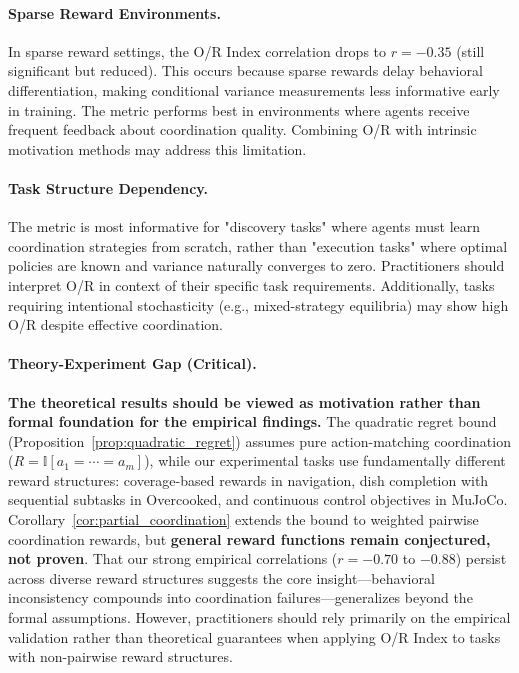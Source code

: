 \documentclass[twoside]{article}
\theoremstyle{remark}
\begin{document}
\paragraph{Sparse Reward Environments.}
In sparse reward settings, the O/R Index correlation drops to $r=-0.35$ (still significant but reduced). This occurs because sparse rewards delay behavioral differentiation, making conditional variance measurements less informative early in training. The metric performs best in environments where agents receive frequent feedback about coordination quality. Combining O/R with intrinsic motivation methods may address this limitation.

\paragraph{Task Structure Dependency.}
The metric is most informative for "discovery tasks" where agents must learn coordination strategies from scratch, rather than "execution tasks" where optimal policies are known and variance naturally converges to zero. Practitioners should interpret O/R in context of their specific task requirements. Additionally, tasks requiring intentional stochasticity (e.g., mixed-strategy equilibria) may show high O/R despite effective coordination.

\paragraph{Theory-Experiment Gap (Critical).}
\textbf{The theoretical results should be viewed as motivation rather than formal foundation for the empirical findings.} The quadratic regret bound (Proposition~\ref{prop:quadratic_regret}) assumes pure action-matching coordination ($R = \mathbb{I}[a_1 = \cdots = a_m]$), while our experimental tasks use fundamentally different reward structures: coverage-based rewards in navigation, dish completion with sequential subtasks in Overcooked, and continuous control objectives in MuJoCo. Corollary~\ref{cor:partial_coordination} extends the bound to weighted pairwise coordination rewards, but \textbf{general reward functions remain conjectured, not proven}. That our strong empirical correlations ($r = -0.70$ to $-0.88$) persist across diverse reward structures suggests the core insight---behavioral inconsistency compounds into coordination failures---generalizes beyond the formal assumptions. However, practitioners should rely primarily on the empirical validation rather than theoretical guarantees when applying O/R Index to tasks with non-pairwise reward structures.
\end{document}
